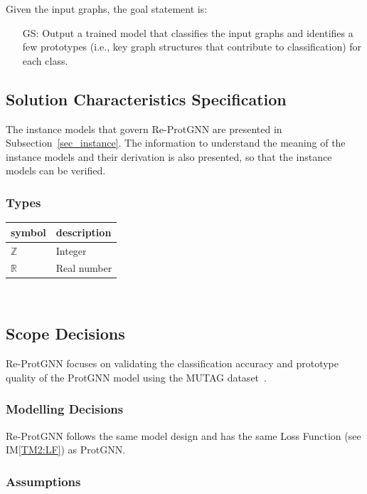 \documentclass[12pt]{article}
\newcounter{goalnum} %
\newcommand{\iref}[1]{IM\ref{#1}}
\begin{document}
\noindent Given the input graphs, the goal statement is:

\begin{itemize}

\item[GS\refstepcounter{goalnum}\thegoalnum \label{GS1}:] Output a trained model that classifies the input graphs and identifies a few prototypes (i.e., key graph structures that contribute to classification) for each class.

\end{itemize}

\subsection{Solution Characteristics Specification}

The instance models that govern Re-ProtGNN are presented in
Subsection~\ref{sec_instance}.  The information to understand the meaning of the
instance models and their derivation is also presented, so that the instance
models can be verified.

\subsubsection{Types}

\begin{tabular}{l l} 
  \toprule		
  \textbf{symbol} & \textbf{description}\\
  \midrule 
  $\mathbb{Z}$ & Integer\\
  $\mathbb{R}$ & Real number\\
  \bottomrule
\end{tabular}\\

\subsection{Scope Decisions} \label{sec_scopeDec}
Re-ProtGNN focuses on validating the classification accuracy and prototype quality of the ProtGNN model using the MUTAG dataset~\citep{debnath1991structure}.


\subsubsection{Modelling Decisions}
Re-ProtGNN follows the same model design and has the same Loss Function (see \iref{TM2:LF}) as ProtGNN.

\subsubsection{Assumptions} \label{sec_assumpt}
\end{document}
